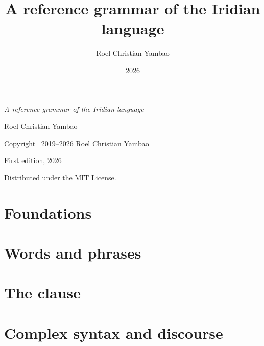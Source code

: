 \documentclass[12pt,a4paper,twoside,openright]{amsbook}
\title{A reference grammar of the Iridian language}
\author{Roel Christian Yambao}
\date{2026}
\begin{document}
\frontmatter
\hypersetup{pageanchor=false}
\bookcover
\thispagestyle{empty}\null\clearpage
\hypersetup{pageanchor=true}
\setcounter{page}{1}
\booktitlepage

\setcounter{page}{2}
\thispagestyle{empty}
\null\vfill
\noindent\small
\textit{A reference grammar of the Iridian language}\par
\noindent Roel Christian Yambao\par
\medskip
\noindent Copyright \textcopyright\ 2019--2026 Roel Christian Yambao\par
\noindent First edition, 2026\par
\medskip
\noindent Distributed under the MIT License.\par
\normalsize
\clearpage

\cleardoublepage

\tableofcontents

\cleardoublepage

\listoftables

\cleardoublepage

\listoffigures

\mainmatter

\part{Foundations}




\part{Words and phrases}






\part{The clause}







\part{Complex syntax and discourse}




\appendix





\backmatter

\end{document}
